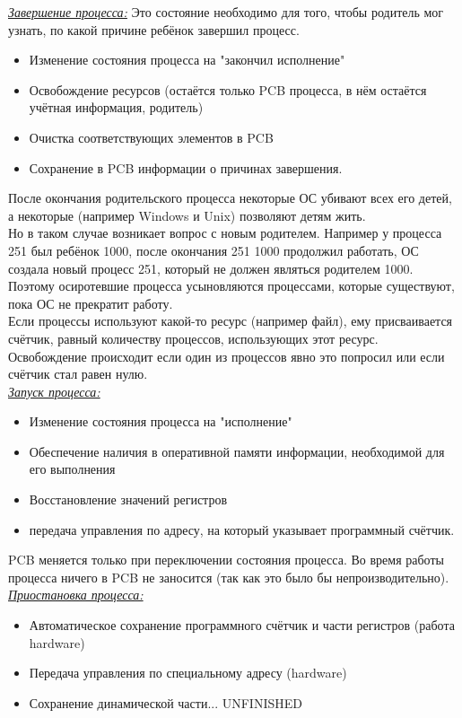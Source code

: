 \documentclass[12pt, a4paper]{article}
\begin{document}
    \underline{\textit{Завершение процесса:}}
    Это состояние необходимо для того, чтобы родитель мог узнать, по какой причине ребёнок завершил процесс.
    \begin{itemize}
        \item Изменение состояния процесса на "закончил исполнение"
        \item Освобождение ресурсов (остаётся только PCB процесса, в нём остаётся учётная информация, родитель)
        \item Очистка соответствующих элементов в PCB
        \item Сохранение в PCB информации о причинах завершения.
    \end{itemize}
    После окончания родительского процесса некоторые ОС убивают всех его детей, а некоторые (например Windows и Unix) позволяют детям жить.\\
    Но в таком случае возникает вопрос с новым родителем. Например у процесса 251 был ребёнок 1000, после окончания 251 1000 продолжил работать, ОС создала новый процесс 251, который не должен являться родителем 1000. Поэтому осиротевшие процесса усыновляются процессами, которые существуют, пока ОС не прекратит работу.\\
    Если процессы используют какой-то ресурс (например файл), ему присваивается счётчик, равный количеству процессов, использующих этот ресурс. Освобождение происходит если один из процессов явно это попросил или если счётчик стал равен нулю.\\
    \underline{\textit{Запуск процесса:}}
    \begin{itemize}
        \item Изменение состояния процесса на "исполнение"
        \item Обеспечение наличия в оперативной памяти информации, необходимой для его выполнения
        \item Восстановление значений регистров
        \item передача управления по адресу, на который указывает программный счётчик.
    \end{itemize}
    PCB меняется только при переключении состояния процесса. Во время работы процесса ничего в PCB не заносится (так как это было бы непроизводительно).
    \underline {\textit{Приостановка процесса:}}
    \begin{itemize}
        \item Автоматическое сохранение программного счётчик и части регистров (работа hardware)
        \item Передача управления по специальному адресу (hardware)
        \item Сохранение динамической части... UNFINISHED
    \end{itemize}
\end{document}
